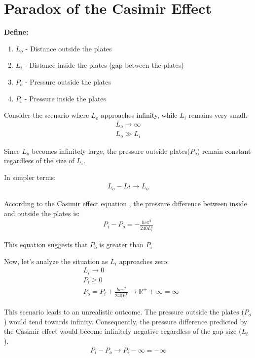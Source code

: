 \section{Paradox of the Casimir Effect}
\noindent\textbf{Define:}
\begin{enumerate}
    \item \(L_o\) - Distance outside the plates
    \item \(L_i\) - Distance inside the plates (gap between the plates)
    \item \(P_o\) - Pressure outside the plates
    \item \(P_i\) - Pressure inside the plates
\end{enumerate}

Consider the scenario where  $L_o$ approaches infinity, while $L_i$ remains very small.
\begin{align}
    L_o \rightarrow \infty \\
    L_o \gg L_i
\end{align}

Since $L_o$ becomes infinitely large, the pressure outside plates($P_o$) remain constant regardless of the size of $L_i$.

\noindent In simpler terms:
\begin{align}L_o - Li \rightarrow L_o\end{align}

According to the Casimir effect equation \cite{enwiki:1212199656}, the pressure difference between inside and outside the plates is:
\begin{align}P_i - P_o = -\frac{\hbar c \pi^2}{240 L_i^4}\end{align}

This equation suggests that $P_o$ is greater than $P_i$

Now, let's analyze the situation as $L_i$ approaches zero:
\begin{align}
    &L_i \rightarrow 0 \\
    &P_i \ge 0 \\
    &P_o = P_i + \frac{\hbar c \pi^2}{240 L_i^4} \rightarrow {\mathbb{R}}^+ + \infty = \infty
\end{align}

This scenario leads to an unrealistic outcome. The pressure outside the plates ($P_o$) would tend towards infinity.
Consequently, the pressure difference predicted by the Casimir effect would become infinitely negative regardless of the gap size ($L_i$).
\begin{align}P_i - P_o \rightarrow P_i - \infty = - \infty\end{align}


